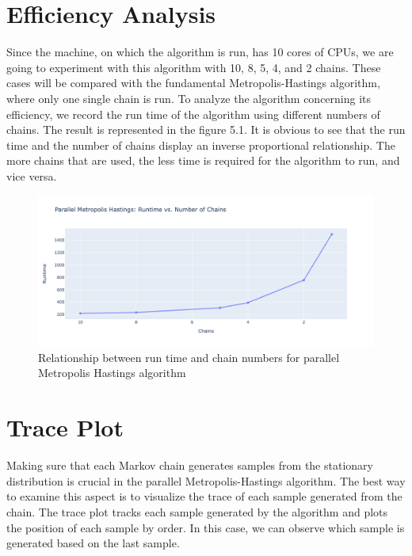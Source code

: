 \section{Efficiency Analysis}
Since the machine, on which the algorithm is run, has 10 cores of CPUs, we are going to experiment with this algorithm with 10, 8, 5, 4, and 2 chains. These cases will be compared with the fundamental Metropolis-Hastings algorithm, where only one single chain is run. To analyze the algorithm concerning its efficiency, we record the run time of the algorithm using different numbers of chains. The result is represented in the figure 5.1. It is obvious to see that the run time and the number of chains display an inverse proportional relationship. The more chains that are used, the less time is required for the algorithm to run, and vice versa.

\begin{figure}[H]
    \centering
    \includegraphics[width=1\textwidth]{figures/parallel_mh/runtime.png}
    \captionsetup{width=.8\textwidth}
    \caption{Relationship between run time and chain numbers for parallel Metropolis Hastings algorithm}
    \label{fig:enter-label}
\end{figure}

\section{Trace Plot}
Making sure that each Markov chain generates samples from the stationary distribution is crucial in the parallel Metropolis-Hastings algorithm. The best way to examine this aspect is to visualize the trace of each sample generated from the chain.\cite{mcmc_practice} The trace plot tracks each sample generated by the algorithm and plots the position of each sample by order. In this case, we can observe which sample is generated based on the last sample.

